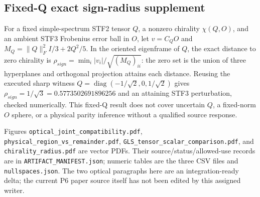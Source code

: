\documentclass[
]{article}
\begin{document}
\hypertarget{fixed-q-exact-sign-radius-supplement}{%
\subsection{Fixed-Q exact sign-radius
supplement}\label{fixed-q-exact-sign-radius-supplement}}

For a fixed simple-spectrum STF2 tensor \(Q\), a nonzero chirality
\(\chi(Q,O)\), and an ambient STF3 Frobenius error ball in \(O\), let
\(v=C_QO\) and \(M_Q=\|Q\|_F^2I/3+2Q^2/5\). In the oriented eigenframe
of \(Q\), the exact distance to zero chirality is
\(\rho_{sign}=\min_i |v_i|/\sqrt{(M_Q)_{ii}}\): the zero set is the
union of three hyperplanes and orthogonal projection attains each
distance. Reusing the executed sharp witness
\(Q=\operatorname{diag}(-1/\sqrt2,0,1/\sqrt2)\) gives
\(\rho_{sign}=1/\sqrt3=0.5773502691896256\) and an attaining STF3
perturbation, checked numerically. This fixed-Q result does not cover
uncertain \(Q\), a fixed-norm \(O\) sphere, or a physical parity
inference without a qualified source response.

Figures \texttt{optical\_\allowbreak{}joint\_\allowbreak{}compatibility.pdf},
\texttt{physical\_\allowbreak{}region\_\allowbreak{}vs\_\allowbreak{}remainder.pdf},
\texttt{GLS\_\allowbreak{}tensor\_\allowbreak{}scalar\_\allowbreak{}comparison.pdf}, and
\texttt{chirality\_radius.pdf} are vector PDFs. Their
source/status/allowed-use records are in
\texttt{ARTIFACT\_MANIFEST.json}; numeric tables are the three CSV files
and \texttt{nullspaces.json}. The two optical paragraphs here are an
integration-ready delta; the current P6 paper source itself has not been
edited by this assigned writer.
\end{document}
